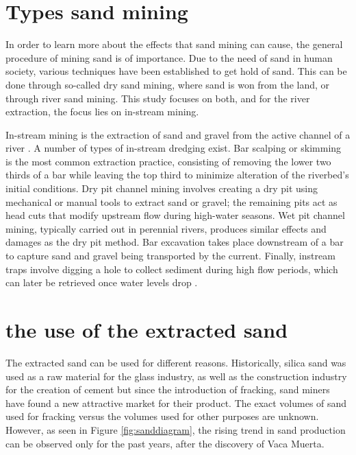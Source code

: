 \section{Types sand mining}
In order to learn more about the effects that sand mining can cause, the general procedure of mining sand is of importance. Due to the need of sand in human society, various techniques have been established to get hold of sand. This can be done through so-called dry sand mining, where sand is won from the land, or through river sand mining. This study focuses on both, and for the river extraction, the focus lies on in-stream mining.

In-stream mining is the extraction of sand and gravel from the active channel of a river \autocite{sand-mining-boek}. A number of types of in-stream dredging exist. Bar scalping or skimming is the most common extraction practice, consisting of removing the lower two thirds of a bar while leaving the top third to minimize alteration of the riverbed’s initial conditions. Dry pit channel mining involves creating a dry pit using mechanical or manual tools to extract sand or gravel; the remaining pits act as head cuts that modify upstream flow during high-water seasons. Wet pit channel mining, typically carried out in perennial rivers, produces similar effects and damages as the dry pit method. Bar excavation takes place downstream of a bar to capture sand and gravel being transported by the current. Finally, instream traps involve digging a hole to collect sediment during high flow periods, which can later be retrieved once water levels drop \autocite{sand-mining-boek}.

\section{the use of the extracted sand}
The extracted sand can be used for different reasons. Historically, silica sand was used as a raw material for the glass industry, as well as the construction industry for the creation of cement but since the introduction of fracking, sand miners have found a new attractive market for their product. The exact volumes of sand used for fracking versus the volumes used for other purposes are unknown. However, as seen in Figure \ref{fig:sanddiagram}, the rising trend in sand production can be observed only for the past years, after the discovery of Vaca Muerta.

